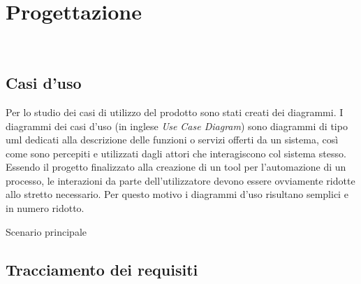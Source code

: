 
\chapter{Progettazione}
\label{cap:progettazione}

\\

\section{Casi d'uso}

Per lo studio dei casi di utilizzo del prodotto sono stati creati dei diagrammi.
I diagrammi dei casi d'uso (in inglese \emph{Use Case Diagram}) sono diagrammi di tipo \gls{uml} dedicati alla descrizione delle funzioni o servizi offerti da un sistema, così come sono percepiti e utilizzati dagli attori che interagiscono col sistema stesso.
Essendo il progetto finalizzato alla creazione di un tool per l'automazione di un processo, le interazioni da parte dell'utilizzatore devono essere ovviamente ridotte allo stretto necessario. Per questo motivo i diagrammi d'uso risultano semplici e in numero ridotto.


\begin{usecase}{0}{Scenario principale}
\label{uc:scenario-principale}
\end{usecase}

\section{Tracciamento dei requisiti}

